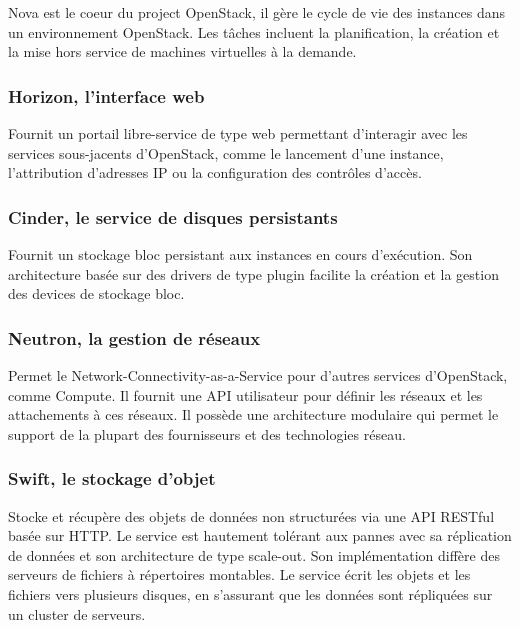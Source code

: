 \documentclass[]{article}
\begin{document}
Nova est le coeur du project OpenStack, il gère le cycle de vie des
instances dans un environnement OpenStack. Les tâches incluent la
planification, la création et la mise hors service de machines
virtuelles à la demande.

\subsubsection{Horizon, l'interface web}\label{horizon-linterface-web}

Fournit un portail libre-service de type web permettant d'interagir avec
les services sous-jacents d'OpenStack, comme le lancement d'une
instance, l'attribution d'adresses IP ou la configuration des contrôles
d'accès.

\subsubsection{Cinder, le service de disques
persistants}\label{cinder-le-service-de-disques-persistants}

Fournit un stockage bloc persistant aux instances en cours d'exécution.
Son architecture basée sur des drivers de type plugin facilite la
création et la gestion des devices de stockage bloc.

\subsubsection{Neutron, la gestion de
réseaux}\label{neutron-la-gestion-de-ruxe9seaux}

Permet le Network-Connectivity-as-a-Service pour d'autres services
d'OpenStack, comme Compute. Il fournit une API utilisateur pour définir
les réseaux et les attachements à ces réseaux. Il possède une
architecture modulaire qui permet le support de la plupart des
fournisseurs et des technologies réseau.

\subsubsection{Swift, le stockage
d'objet}\label{swift-le-stockage-dobjet}

Stocke et récupère des objets de données non structurées via une API
RESTful basée sur HTTP. Le service est hautement tolérant aux pannes
avec sa réplication de données et son architecture de type scale-out.
Son implémentation diffère des serveurs de fichiers à répertoires
montables. Le service écrit les objets et les fichiers vers plusieurs
disques, en s'assurant que les données sont répliquées sur un cluster de
serveurs.
\end{document}
